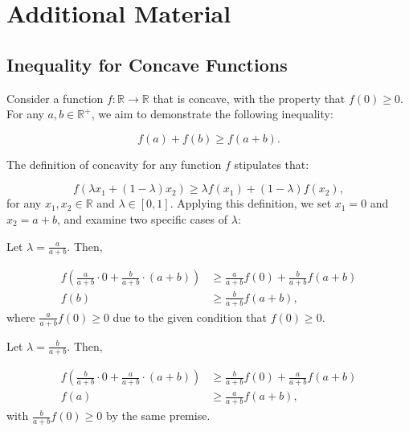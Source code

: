 \chapter{Additional Material}

\section{Inequality for Concave Functions}
\label{app:concave_inequality}

Consider a function \( f: \mathbb{R} \rightarrow \mathbb{R} \) that is concave, with the property that \( f(0) \geq 0 \). For any \( a, b \in \mathbb{R}^+ \), we aim to demonstrate the following inequality:

\begin{equation*}
f(a) + f(b) \geq f(a + b).
\end{equation*}

The definition of concavity for any function \( f \) stipulates that:

\begin{equation*}
f(\lambda x_1 + (1 - \lambda)x_2) \geq \lambda f(x_1) + (1 - \lambda)f(x_2),
\end{equation*}
for any \( x_1, x_2 \in \mathbb{R} \) and \( \lambda \in [0, 1] \). Applying this definition, we set \( x_1 = 0 \) and \( x_2 = a + b \), and examine two specific cases of \( \lambda \):

Let \( \lambda = \frac{a}{a + b} \). Then,

\begin{equation*}
\begin{aligned}
    f\left( \frac{a}{a+b} \cdot 0 + \frac{b}{a+b} \cdot (a+b) \right) 
    &\geq \frac{a}{a + b}f(0) + \frac{b}{a+b}f(a+b) \\
    f(b) &\geq \frac{b}{a+b}f(a+b),
\end{aligned}
\end{equation*}
where \( \frac{a}{a + b}f(0) \geq 0 \) due to the given condition that \( f(0) \geq 0 \).

Let \( \lambda = \frac{b}{a + b} \). Then,

\begin{equation*}
\begin{aligned}
    f\left( \frac{b}{a+b} \cdot 0 + \frac{a}{a+b} \cdot (a+b) \right) 
    &\geq \frac{b}{a + b}f(0) + \frac{a}{a+b}f(a+b) \\
    f(a) &\geq \frac{a}{a+b}f(a+b),
\end{aligned}
\end{equation*}
with \( \frac{b}{a + b}f(0) \geq 0 \) by the same premise.

